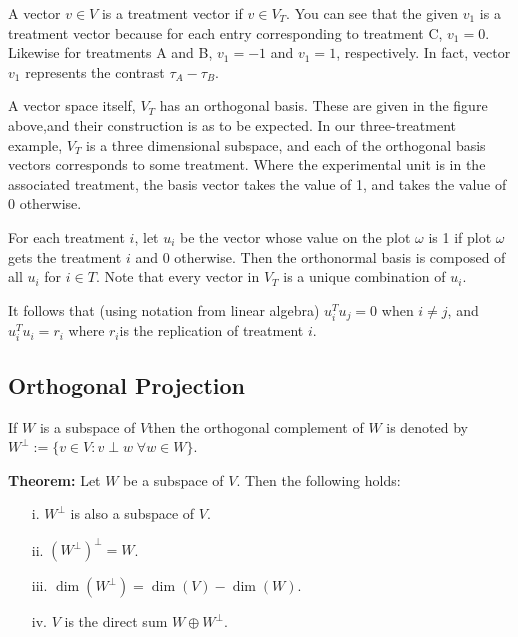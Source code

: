 \documentclass{tufte-book}
\begin{document}
A vector $v \in V$ is a treatment vector if $v \in V_{T}$. You can see that the given $v_{1}$ is a treatment vector because 
for each entry corresponding to treatment C, $v_{1} = 0$. Likewise for treatments A and B, $v_{1} = -1$ and $v_{1} = 1$, 
respectively. In fact, vector $v_{1}$ represents the contrast $\tau_{A} - \tau_{B}$.\newline

A vector space itself, $V_{T}$ has an orthogonal basis. These are given in the figure above,and their construction is as to be 
expected. In our three-treatment example, $V_{T}$ is a three dimensional subspace, and each of the orthogonal basis vectors 
corresponds to some treatment. Where the experimental unit is in the associated treatment, the basis vector takes the value 
of 1, and takes the value of 0 otherwise. \newline

For each treatment $i$, let $u_{i}$ be the vector whose value on the plot $\omega$ is 1 if plot $\omega$ gets the treatment 
$i$ and 0 otherwise. Then the orthonormal basis is composed of all $u_{i}$ for $i \in T$. Note that every vector in $V_{T}$ is 
a unique combination of $u_{i}$. \newline

It follows that (using notation from linear algebra) $u_{i}^{T}u_{j} = 0$ when $i \neq j$, and $u_{i}^{T}u_{i} = r_{i}$ where 
$r_{i}$is the replication of treatment $i$.\newline

\subsection{Orthogonal Projection}

If $W$ is a subspace of $V$then the orthogonal complement of $W$ is denoted by 
$W^{\perp} := \{v \in V : v \perp w \;\forall w \in W \}$. \newline

\textbf{Theorem:} Let $W$ be a subspace of $V$. Then the following holds:

\begin{enumerate}
    \item[i.] $W^{\perp}$ is also a subspace of $V$.
    \item[ii.] $(W^{\perp})^{\perp} = W$.
    \item[iii.] $ \dim (W^{\perp}) = \dim(V) - \dim(W)$.
    \item[iv.] $V$ is the direct sum $W \oplus W^{\perp}$.
    
\end{enumerate}
\end{document}
